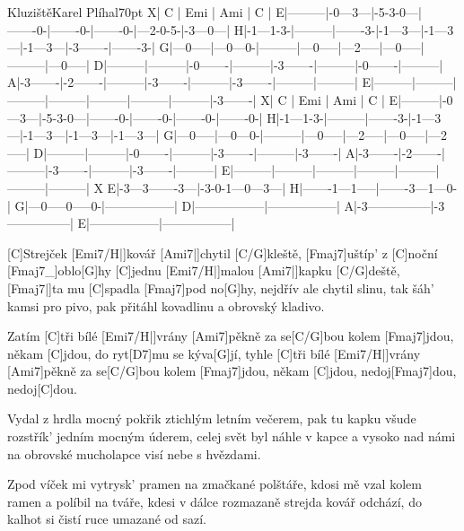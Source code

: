\begin{song}{Kluziště}{Karel Plíhal}{70pt}
\tabs{0pt}
X| C       | Emi     | Ami     | C       |
E|---------|-0---3---|-5-3-0---|-------0-|-------0-|-------0-|---2-0-5-|-3---0---|
H|-1---1-3-|---------|-------3-|-1---3---|-1---3---|-1---3---|-3-------|-------3-|
G|---0-----|---0---0-|---------|---0-----|---2-----|---0-----|---------|---0-----|
D|---------|---------|-0-------|---------|-3-------|---------|-0-------|---------|
A|-3-------|-2-------|---------|-3-------|---------|-3-------|---------|---------|
E|---------|---------|---------|---------|---------|---------|---------|-3-------|
\endtabs
\tabs{0pt}
X| C       | Emi     | Ami     |  C      |
E|---------|-0---3---|-5-3-0---|-------0-|-------0-|-------0-|-------0-|
H|-1---1-3-|---------|-------3-|-1---3---|-1---3---|-1---3---|-1---3---|
G|---0-----|---0---0-|---------|---0-----|---2-----|---0-----|---2-----|
D|---------|---------|-0-------|---------|-3-------|---------|-3-------|
A|-3-------|-2-------|---------|-3-------|---------|-3-------|---------|
E|---------|---------|---------|---------|---------|---------|---------|
\endtabs
\tabs{0pt}
X
E|-3---3-------3---|-3-0-1---0---3---|
H|-------1---1-----|-------3---1---0-|
G|---0-----0-----0-|-----------------|
D|-----------------|-----------------|
A|-3---------------|-3---------------|
E|-----------------|-----------------|
\endtabs

%
[C]Strejček [Emi7/H|]{kovář} [Ami7|]{chytil} [C/G]kleště, [Fmaj7]{uštíp'} z [C]noční [Fmaj7_]{oblo}[G]hy
[C]jednu [Emi7/H|]{malou} [Ami7|]{kapku} [C/G]deště, [Fmaj7|]{ta mu} [C]spadla [Fmaj7]pod no[G]hy,
nejdřív ale chytil slinu, tak šáh' kamsi pro pivo,
pak přitáhl kovadlinu a obrovský kladivo.

\chorus%
Zatím [C]tři bílé [Emi7/H|]{vrány} [Ami7]pěkně za se[C/G]bou
kolem [Fmaj7]jdou, někam [C]jdou, do ryt[D7]mu se kýva[G]jí,
tyhle [C]tři bílé [Emi7/H|]{vrány} [Ami7]pěkně za se[C/G]bou
kolem [Fmaj7]jdou, někam [C]jdou, nedoj[Fmaj7]dou, nedoj[C]dou.

%
Vydal z hrdla mocný pokřik ztichlým letním večerem,
pak tu kapku všude rozstřík' jedním mocným úderem,
celej svět byl náhle v kapce a vysoko nad námi
na obrovské mucholapce visí nebe s hvězdami.
\repchor

%
Zpod víček mi vytrysk' pramen na zmačkané polštáře,
kdosi mě vzal kolem ramen a políbil na tváře,
kdesi v dálce rozmazaně strejda kovář odchází,
do kalhot si čistí ruce umazané od sazí.
\end{song}
\vfil
\hfil{}
